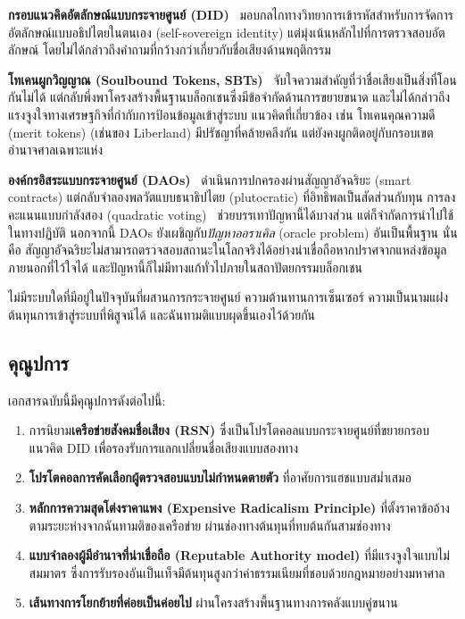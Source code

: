 \documentclass[11pt,a4paper,twocolumn]{article}
\begin{document}
\textbf{กรอบแนวคิดอัตลักษณ์แบบกระจายศูนย์ (DID)}~\cite{did2022} มอบกลไกทางวิทยาการเข้ารหัสสำหรับการจัดการอัตลักษณ์แบบอธิปไตยในตนเอง (self-sovereign identity) แต่มุ่งเน้นหลักไปที่การตรวจสอบอัตลักษณ์ โดยไม่ได้กล่าวถึงคำถามที่กว้างกว่าเกี่ยวกับชื่อเสียงด้านพฤติกรรม

\textbf{โทเคนผูกวิญญาณ (Soulbound Tokens, SBTs)}~\cite{weyl2022} จับใจความสำคัญที่ว่าชื่อเสียงเป็นสิ่งที่โอนกันไม่ได้ แต่กลับพึ่งพาโครงสร้างพื้นฐานบล็อกเชนซึ่งมีข้อจำกัดด้านการขยายขนาด และไม่ได้กล่าวถึงแรงจูงใจทางเศรษฐกิจที่กำกับการป้อนข้อมูลเข้าสู่ระบบ แนวคิดที่เกี่ยวข้อง เช่น โทเคนคุณความดี (merit tokens) (เช่นของ Liberland) มีปรัชญาที่คล้ายคลึงกัน แต่ยังคงผูกติดอยู่กับกรอบเขตอำนาจศาลเฉพาะแห่ง

\textbf{องค์กรอิสระแบบกระจายศูนย์ (DAOs)}~\cite{buterin2014} ดำเนินการปกครองผ่านสัญญาอัจฉริยะ (smart contracts) แต่กลับจำลองพลวัตแบบธนาธิปไตย (plutocratic) ที่อิทธิพลเป็นสัดส่วนกับทุน การลงคะแนนแบบกำลังสอง (quadratic voting)~\cite{buterin2019} ช่วยบรรเทาปัญหานี้ได้บางส่วน แต่ก็จำกัดการนำไปใช้ในทางปฏิบัติ นอกจากนี้ DAOs ยังเผชิญกับ\emph{ปัญหาออราเคิล} (oracle problem) อันเป็นพื้นฐาน นั่นคือ สัญญาอัจฉริยะไม่สามารถตรวจสอบสถานะในโลกจริงได้อย่างน่าเชื่อถือหากปราศจากแหล่งข้อมูลภายนอกที่ไว้ใจได้ และปัญหานี้ก็ไม่มีทางแก้ทั่วไปภายในสถาปัตยกรรมบล็อกเชน

ไม่มีระบบใดที่มีอยู่ในปัจจุบันที่ผสานการกระจายศูนย์ ความต้านทานการเซ็นเซอร์ ความเป็นนามแฝง ต้นทุนการเข้าสู่ระบบที่พิสูจน์ได้ และฉันทามติแบบผุดขึ้นเองไว้ด้วยกัน

\subsection{คุณูปการ}

เอกสารฉบับนี้มีคุณูปการดังต่อไปนี้:
\begin{enumerate}[nosep]
\item การนิยาม\textbf{เครือข่ายสังคมชื่อเสียง (RSN)} ซึ่งเป็นโปรโตคอลแบบกระจายศูนย์ที่ขยายกรอบแนวคิด DID เพื่อรองรับการแลกเปลี่ยนชื่อเสียงแบบสองทาง
\item \textbf{โปรโตคอลการคัดเลือกผู้ตรวจสอบแบบไม่กำหนดตายตัว} ที่อาศัยการแฮชแบบสม่ำเสมอ~\cite{karger1997}
\item \textbf{หลักการความสุดโต่งราคาแพง (Expensive Radicalism Principle)} ที่ตั้งราคาข้ออ้างตามระยะห่างจากฉันทามติของเครือข่าย ผ่านช่องทางต้นทุนที่ทบต้นกันสามช่องทาง
\item \textbf{แบบจำลองผู้มีอำนาจที่น่าเชื่อถือ (Reputable Authority model)} ที่มีแรงจูงใจแบบไม่สมมาตร ซึ่งการรับรองอันเป็นเท็จมีต้นทุนสูงกว่าค่าธรรมเนียมที่ชอบด้วยกฎหมายอย่างมหาศาล
\item \textbf{เส้นทางการโยกย้ายที่ค่อยเป็นค่อยไป} ผ่านโครงสร้างพื้นฐานทางการคลังแบบคู่ขนาน
\end{enumerate}
\end{document}
